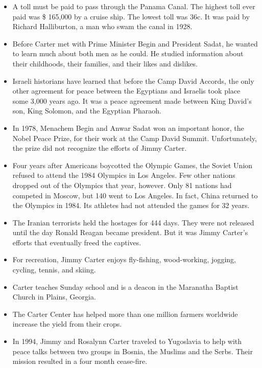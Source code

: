 \documentclass{article}
\begin{document}
\begin{itemize}
\item A toll must be paid to pass through the Panama Canal. The highest toll ever paid was \$ 165,000 by a cruise ship. The lowest toll was 36c. It was paid by Richard Halliburton, a man who swam the canal in 1928.

\item Before Carter met with Prime Minister Begin and President Sadat, he wanted to learn much about both men as he could. He studied information about their childhoods, their families, and their likes and dislikes.

\item Israeli historians have learned that before the Camp David Accords, the only other agreement for peace between the Egyptians and Israelis took place some 3,000 years ago. It was a peace agreement made between King David's son, King Solomon, and the Egyptian Pharaoh.

\item In 1978, Menachem Begin and Anwar Sadat won an important honor, the Nobel Peace Prize, for their work at the Camp David Summit. Unfortunately, the prize did not recognize the efforts of Jimmy Carter.

\item Four years after Americans boycotted the Olympic Games, the Soviet Union refused to attend the 1984 Olympics in Los Angeles. Few other nations dropped out of the Olympics that year, however. Only 81 nations had competed in Moscow, but 140 went to Los Angeles. In fact, China returned to the Olympics in 1984. Its athletes had not attended the games for 32 years.

\item The Iranian terrorists held the hostages for 444 days. They were not released until the day Ronald Reagan became president. But it was Jimmy Carter's efforts that eventually freed the captives.

\item For recreation, Jimmy Carter enjoys fly-fishing, wood-working, jogging, cycling, tennis, and skiing.

\item Carter teaches Sunday school and is a deacon in the Maranatha Baptist Church in Plains, Georgia.

\item The Carter Center has helped more than one million farmers worldwide increase the yield from their crops.

\item In 1994, Jimmy and Rosalynn Carter traveled to Yugoslavia to help with peace talks between two groups in Bosnia, the Muslims and the Serbs. Their mission resulted in a four month cease-fire.


\end{itemize}
\end{document}
